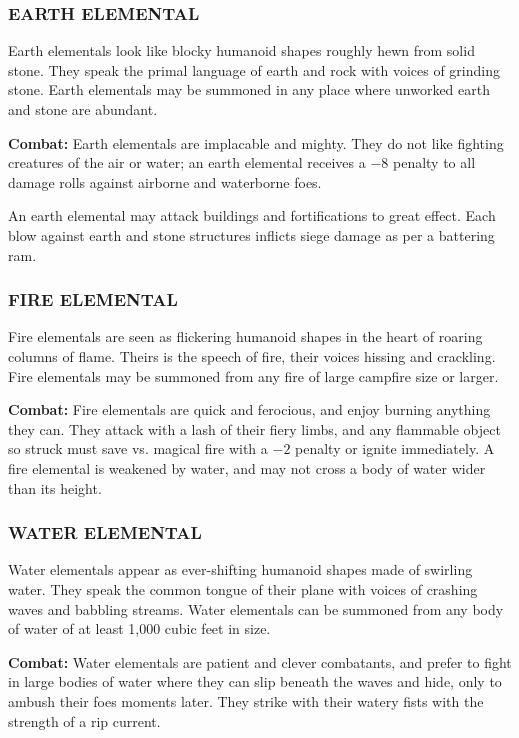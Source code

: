 \begin{multicols}{2}
\subsubsection{EARTH ELEMENTAL}

Earth elementals look like blocky humanoid shapes roughly hewn from solid stone. They speak the primal language of earth and rock with voices of grinding stone. Earth elementals may be summoned in any place where unworked earth and stone are abundant.

\textbf{Combat:} Earth elementals are implacable and mighty. They do not like fighting creatures of the air or water; an earth elemental receives a $-8$ penalty to all damage rolls against airborne and waterborne foes.

An earth elemental may attack buildings and fortifications to great effect. Each blow against earth and stone structures inflicts siege damage as per a battering ram.

\subsubsection{FIRE ELEMENTAL}

Fire elementals are seen as flickering humanoid shapes in the heart of roaring columns of flame. Theirs is the speech of fire, their voices hissing and crackling. Fire elementals may be summoned from any fire of large campfire size or larger.

\textbf{Combat:} Fire elementals are quick and ferocious, and enjoy burning anything they can. They attack with a lash of their fiery limbs, and any flammable object so struck must save vs. magical fire with a $-2$ penalty or ignite immediately. A fire elemental is weakened by water, and may not cross a body of water wider than its height.

\subsubsection{WATER ELEMENTAL}

Water elementals appear as ever-shifting humanoid shapes made of swirling water. They speak the common tongue of their plane with voices of crashing waves and babbling streams. Water elementals can be summoned from any body of water of at least 1,000 cubic feet in size.

\textbf{Combat:} Water elementals are patient and clever combatants, and prefer to fight in large bodies of water where they can slip beneath the waves and hide, only to ambush their foes moments later. They strike with their watery fists with the strength of a rip current.


\end{multicols}
